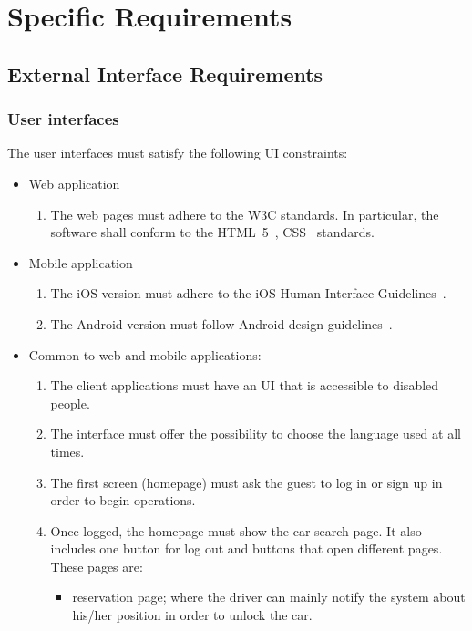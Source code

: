 \section{Specific Requirements}\label{sec requirements}

\subsection{External Interface Requirements}

\subsubsection{User interfaces}

The user interfaces must satisfy the following UI constraints:
\begin{itemize}
	\item Web application
	\begin{enumerate}
		\item The web pages must adhere to the W3C standards. In particular, the software shall conform to the HTML~5~\cite{w3c-html5}, CSS~\cite{w3c-css} standards.
	\end{enumerate}
	\item Mobile application
	\begin{enumerate}
		\item The iOS version must adhere to the iOS Human Interface Guidelines~\cite{apple-ios-hig}.
		\item The Android version must follow Android design guidelines~\cite{google-android-hig}.
	\end{enumerate}
		\item Common to web and mobile applications:
		\begin{enumerate}
			\item The client applications must have an UI that is accessible to disabled people.
			\item The interface must offer the possibility to choose the language used at all times.
			\item The first screen (homepage) must ask the guest to log in or sign up in order to begin operations.
			\item Once logged, the homepage must show the car search page. It also includes one button for log out and buttons that open different pages. These pages are:
				\begin{itemize}
					\item reservation page; where the driver can mainly notify the system about his/her position in order to unlock the car.

\end{itemize}
\end{enumerate}
\end{itemize}
